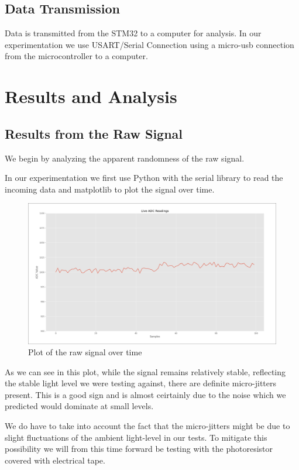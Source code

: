 \subsection{Data Transmission}
Data is transmitted from the STM32 to a computer for analysis. 
In our experimentation we use USART/Serial Connection using 
a micro-usb connection from the microcontroller to a computer.

\newpage
\section{Results and Analysis}
\subsection{Results from the Raw Signal}
We begin by analyzing the apparent randomness 
of the raw signal. 

In our experimentation we first use Python with the serial library 
to read the incoming data and matplotlib to plot the signal 
over time.

\begin{figure}[h]
    \centering
    \includegraphics[width=0.9\linewidth]{./images/LIVE_READINGS_SMALL_WINDOW.png} 
    \caption{Plot of the raw signal over time}
    \label{fig:raw_signal_plot} 
\end{figure}

As we can see in this plot, while the signal remains relatively stable,
reflecting the stable light level we were testing against, 
there are definite micro-jitters present. This is a good 
sign and is almost ceirtainly due to the noise which we predicted 
would dominate at small levels.

We do have to take into account the fact that the micro-jitters 
might be due to slight fluctuations of the ambient light-level in 
our tests. To mitigate this possibility we will from this time 
forward be testing with the photoresistor covered with electrical 
tape. 

